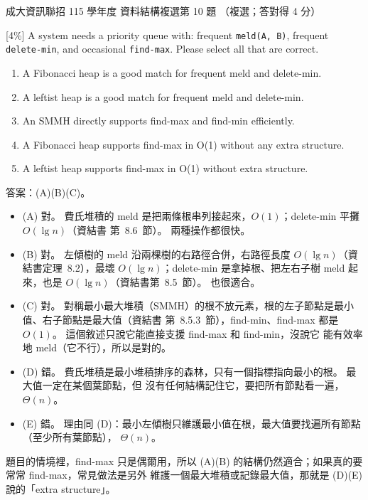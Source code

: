 \begin{pastexam}[label={px:ncku-115-prog-07}]{成大資訊聯招 115 學年度 資料結構複選第 10 題}
（複選；答對得 4 分）

[4\%] A system needs a priority queue with: frequent \texttt{meld(A, B)}, frequent \texttt{delete-min},
and occasional \texttt{find-max}. Please select all that are correct.
\begin{enumerate}[label=(\Alph*),nosep]
\item A Fibonacci heap is a good match for frequent meld and delete-min.
\item A leftist heap is a good match for frequent meld and delete-min.
\item An SMMH directly supports find-max and find-min efficiently.
\item A Fibonacci heap supports find-max in O(1) without any extra structure.
\item A leftist heap supports find-max in O(1) without extra structure.
\end{enumerate}
\end{pastexam}

\begin{pastsoln}
答案：(A)(B)(C)。

\begin{itemize}
\item (A) 對。 費氏堆積的 meld 是把兩條根串列接起來，$O(1)$；delete-min 平攤 $O(\lg n)$（資結書
第~8.6~節）。 兩種操作都很快。
\item (B) 對。 左傾樹的 meld 沿兩棵樹的右路徑合併，右路徑長度 $O(\lg n)$（資結書定理~8.2），最壞
$O(\lg n)$；delete-min 是拿掉根、把左右子樹 meld 起來，也是 $O(\lg n)$（資結書第~8.5~節）。 也很適合。
\item (C) 對。 對稱最小最大堆積（SMMH）的根不放元素，根的左子節點是最小值、右子節點是最大值（資結書
第~8.5.3~節），find-min、find-max 都是 $O(1)$。 這個敘述只說它能直接支援 find-max 和 find-min，沒說它
能有效率地 meld（它不行），所以是對的。
\item (D) 錯。 費氏堆積是最小堆積排序的森林，只有一個指標指向最小的根。 最大值一定在某個葉節點，但
沒有任何結構記住它，要把所有節點看一遍，$\Theta(n)$。
\item (E) 錯。 理由同 (D)：最小左傾樹只維護最小值在根，最大值要找遍所有節點（至少所有葉節點），
$\Theta(n)$。
\end{itemize}
題目的情境裡，find-max 只是偶爾用，所以 (A)(B) 的結構仍然適合；如果真的要常常 find-max，常見做法是另外
維護一個最大堆積或記錄最大值，那就是 (D)(E) 說的「extra structure」。
\end{pastsoln}
